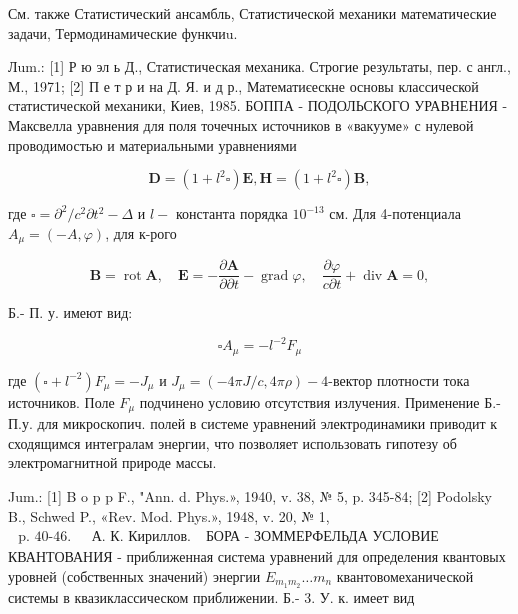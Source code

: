 \documentclass[10pt]{article}
\begin{document}
См. также Статистический ансамбль, Статистической механики математические задачи, Термодинамические функчиu.



Лum.: [1] Р ю эл ь Д., Статистическая механика. Строгие результаты, пер. с англ., М., 1971; [2] П е т р и на Д. Я. и д р., Математиєескне основы классической статистической механики, Киев, 1985. БОППА - ПОДОЛЬСКОГО УРАВНЕНИЯ - Максвелла уравнения для поля точечных источников в «вакууме» с нулевой проводимостью и материальными уравнениями



\[

\boldsymbol{D}=\left(1+l^{2} \square\right) \boldsymbol{E}, \boldsymbol{H}=\left(1+l^{2} \square\right) \boldsymbol{B},

\]



где $\square=\partial^{2} / c^{2} \partial t^{2}-\Delta$ и $l-$ константа порядка $10^{-13}$ см. Для 4-потенциала $A_{\mu}=(-A, \varphi)$, для к-рого



\[

\boldsymbol{B}=\operatorname{rot} \boldsymbol{A}, \quad \boldsymbol{E}=-\frac{\partial \boldsymbol{A}}{\partial \partial t}-\operatorname{grad} \varphi, \quad \frac{\partial \varphi}{c \partial t}+\operatorname{div} \boldsymbol{A}=0,

\]



Б.- П. у. имеют вид:



\[

\square A_{\mu}=-l^{-2} F_{\mu}

\]



где $\left(\square+l^{-2}\right) F_{\mu}=-J_{\mu}$ и $J_{\mu}=(-4 \pi J / c, 4 \pi \rho)-4$-вектор плотности тока источников. Поле $F_{\mu}$ подчинено условию отсутствия излучения. Применение Б.- П.у. для микроскопич. полей в системе уравнений электродинамики приводит к сходящимся интегралам энергии, что позволяет использовать гипотезу об электромагнитной природе массы.



Jum.: [1] B o p p F., "Ann. d. Phys.», 1940, v. 38, № 5, p. 345-84; [2] Podolsky B., Schwed P., «Rev. Mod. Phys.», 1948, v. 20, № 1, $\begin{array}{ll}\text { p. 40-46. } & \text { А. К. Кириллов. }\end{array}$ БОРА - ЗОММЕРФЕЛЬДА УСЛОВИЕ КВАНТОВАНИЯ - приближенная система уравнений для определения квантовых уровней (собственных значений) энергии $E_{m_{1} m_{2}} \ldots m_{n}$ квантовомеханической системы в квазиклассическом приближении. Б.- 3. У. к. имеет вид
\end{document}
